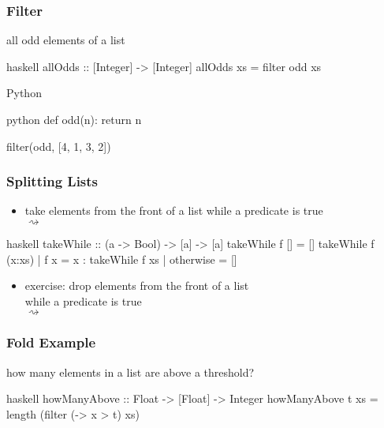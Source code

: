 \documentclass[dvipsnames]{beamer}
\theoremstyle{plain}
\begin{document}
\begin{frame}[fragile]
  \frametitle{Filter}

  \begin{exampleblock}{all odd elements of a list}
    \begin{pygments}{haskell}
allOdds :: [Integer] -> [Integer]
allOdds xs = filter odd xs
    \end{pygments}
  \end{exampleblock}

  \bigskip
  \begin{exampleblock}{Python}
    \begin{pygments}{python}
def odd(n):
    return n %

filter(odd, [4, 1, 3, 2])
    \end{pygments}
  \end{exampleblock}
\end{frame}

\begin{frame}[fragile]
  \frametitle{Splitting Lists}

  \begin{itemize}
    \item take elements from the front of a list while a predicate is true\\
       $\rightsquigarrow$
  \end{itemize}

  \begin{exampleblock}{}
    \begin{pygments}{haskell}
takeWhile :: (a -> Bool) -> [a] -> [a]
takeWhile f []     = []
takeWhile f (x:xs)
  | f x       = x : takeWhile f xs
  | otherwise = []
    \end{pygments}
  \end{exampleblock}

  \pause
  \begin{itemize}
    \item exercise: drop elements from the front of a list\\
      while a predicate is true\\
       $\rightsquigarrow$
  \end{itemize}
\end{frame}

\begin{frame}[fragile]
  \frametitle{Fold Example}

  \begin{exampleblock}{how many elements in a list are above a threshold?}
    \begin{pygments}{haskell}
howManyAbove :: Float -> [Float] -> Integer
howManyAbove t xs = length (filter (\x -> x > t) xs)
    \end{pygments}
  \end{exampleblock}
\end{frame}
\end{document}
